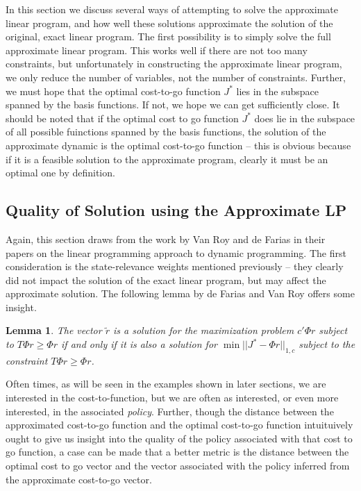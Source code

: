 \documentclass[12pt,reqno]{amsart}
\newtheorem{lem}[thm]{Lemma}
\numberwithin{equation}{section}
\begin{document}
In this section we discuss several ways of attempting to solve the approximate linear program, and how well these solutions approximate the solution of the original, exact linear program. The first possibility is to simply solve the full approximate linear program. This works well if there are not too many constraints, but unfortunately in constructing the approximate linear program, we only reduce the number of variables, not the number of constraints. Further, we must hope that the optimal cost-to-go function $J^*$ lies in the subspace spanned by the basis functions. If not, we hope we can get sufficiently close. It should be noted that if the optimal cost to go function $J^*$ does lie in the subspace of all possible fuinctions spanned by the basis functions, the solution of the approximate dynamic is the optimal cost-to-go function -- this is obvious because if it is a feasible solution to the approximate program, clearly it must be an optimal one by definition.

\subsection{Quality of Solution using the Approximate LP}

Again, this section draws from the work by Van Roy and de Farias in their papers on the linear programming approach to dynamic programming. The first consideration is the state-relevance weights mentioned previously -- they clearly did not impact the solution of the exact linear program, but may affect the approximate solution. The following lemma by de Farias and Van Roy offers some insight.

\begin{lem}
The vector $\tilde{r}$ is a solution for the maximization problem $c'\Phi r$ subject to $T \Phi r \geq \Phi r$ if and only if it is also a solution for $\min || J^* - \Phi r||_{1,c}$ subject to the constraint $T \Phi r \geq \Phi r$.
\end{lem}

Often times, as will be seen in the examples shown in later sections, we are interested in the cost-to-function, but we are often as interested, or even more interested, in the associated {\it policy}. Further, though the distance between the approximated cost-to-go function and the optimal cost-to-go function intuituively ought to give us insight into the quality of the policy associated with that cost to go function, a case can be made that a better metric is the distance between the optimal cost to go vector and the vector associated with the policy inferred from the approximate cost-to-go vector.
\end{document}
